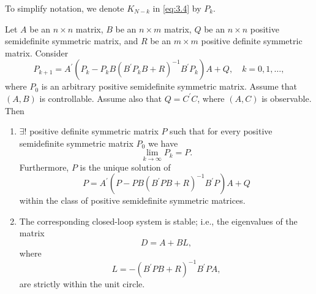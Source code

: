 To simplify notation, we denote $K_{N-k}$ in \cref{eq:3.4} by $P_k$. 
\begin{proposition}
    Let $A$ be an $n\times n$ matrix, $B$ be an $n\times m$ matrix, $Q$ be an $n\times n$ positive semidefinite symmetric matrix, and $R$ be an $m\times m$ positive definite symmetric matrix. Consider 
    \begin{equation}\label{eq:3.8}
        P_{k + 1} = A ^\prime(P_k - P_k B(B^\prime P_k B + R)^{ - 1}B^\prime P_k)A + Q,\quad k = 0,1,\dots,
    \end{equation}
    where $P_0$ is an arbitrary positive semidefinite symmetric matrix. Assume that $(A,B)$ is controllable. Assume also that $Q=C^\prime C$, where $(A,C)$ is observable. Then
    \begin{enumerate}[label=(\alph*)]
        \item $\exists! $ positive definite symmetric matrix $P$ such that for every positive semidefinite symmetric matrix $P_0$ we have \[\lim_{k\rightarrow\infty}P_k = P.\]
        Furthermore, $P$ is the unique solution of \begin{equation}\label{eq:3.9}
            P = A^\prime (P - PB(B^\prime P B + R)^{ - 1}B^\prime P)A + Q
        \end{equation}
        within the class of positive semidefinite symmetric matrices.
        \item The corresponding closed-loop system is stable; i.e., the eigenvalues of the matrix \begin{equation}\label{eq:3.10}
            D = A + B L ,
        \end{equation}
        where \begin{equation}\label{eq:3.11}
            L =- {(B^\prime P B + R)}^{ - 1}B^\prime P A,
        \end{equation}
        are strictly within the unit circle.
    \end{enumerate}
\end{proposition}

